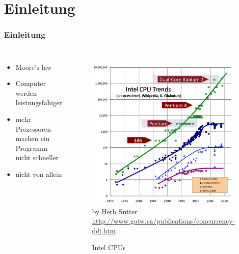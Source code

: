 \section{Einleitung}

\begin{frame}[c]
    \frametitle{Einleitung}
    \begin{columns}
        \begin{itemize}
            \item Moore's law
            \item Computer werden leistungsfähiger
            \item mehr Prozessoren machen ein Programm nicht schneller
            \item nicht von allein
        \end{itemize}
        \begin{figure}
            \centering
            \copyrightbox%
                {\includegraphics[height=0.6\textheight]{content/images/CPU}}%
                {by Herb Sutter \url{http://www.gotw.ca/publications/concurrency-ddj.htm}}
            \caption{Intel CPUs}
        \end{figure}
    \end{columns}
\end{frame}
